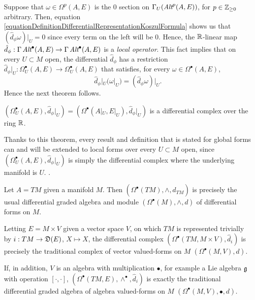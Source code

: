 Suppose that $\omega \in \Omega^p(A, E)$ is the $0$ section on $\Gamma_U(\operatorname{\textit{Alt}}^p(A, E))$, for $p \in \mathbb{Z}_{\geq 0}$ arbitrary. Then, equation \ref{equationDefinitionDifferentialRepresentationKoszulFormula} shows us that $(\hat d_\phi \omega)|_U = 0$ since every term on the left will be $0$. Hence, the $\mathbb{R}$-linear map $\hat d_\phi : \Gamma \Alt^\bullet(A, E) \to \Gamma \Alt^\bullet(A, E)$ is a \emph{local operator}. This fact implies that on every $U \subset M$ open, the differential $\hat d_\phi$ has a restriction $\hat d_\phi|_U: \Omega_U^\bullet(A, E) \to \Omega_U^\bullet(A, E)$ that satisfies, for every $\omega \in \Omega^\bullet(A, E)$, 
    \begin{equation} \label{equationRestrictionOfDifferentialLocalOperatorGoodRestriction}
        \hat d_\phi|_U( \omega|_U) = (\hat d_\phi \omega)|_U.
    \end{equation} 
Hence the next theorem follows.

\begin{theorem}
$(\Omega_U^\bullet(A, E), \hat d_\phi|_U)  = (\Omega^\bullet(A|_U, E|_U), \hat d_\phi|_U)$ is a differential complex over the ring $\mathbb{R}$.
\end{theorem}

\begin{remark}\label{remarkEveryResultAboutDIfferentialComplexExtendedLOcally}
Thanks to this theorem, every result and definition that is stated for global forms can and will be extended to local forms over every $U \subset M$ open, since $(\Omega_U^\bullet(A, E), \hat d_\phi|_U)$ is simply the differential complex where the underlying manifold is $U$. .
\end{remark}

\lin

\begin{example}\label{exampleTraditionalCaseTangentBundleUpToDifferential}
Let $A = TM$ given a manifold $M$. Then $(\Omega^\bullet (TM), \wedge, \hat d_{TM})$ is precisely the usual differential graded algebra and module $(\Omega^\bullet (M), \wedge, d)$ of differential forms on $M$.

\noindent Letting $E = M \times V$ given a vector space $V$, on which $TM$ is represented trivially by $i: TM \to \mathfrak{D}(E)$, $X \mapsto X$, the differential complex $(\Omega^\bullet(TM, M \times V), \hat d_i)$ is precisely the traditional complex of vector valued-forms on $M$ $(\Omega^\bullet(M, V), d)$. 

\noindent If, in addition, $V$ is an algebra with multiplication $\bullet$, for example a Lie algebra $\mathfrak{g}$ with operation $[\cdot, \cdot]$, $(\Omega^\bullet(TM, E), \wedge^\bullet, \hat d_i)$ is exactly the traditional differential graded algebra of algebra valued-forms on $M$ $(\Omega^\bullet(M, V), \bullet, d)$.
\end{example}

